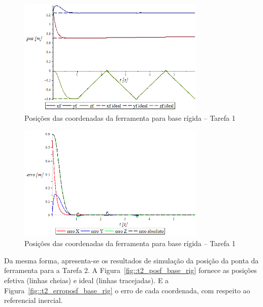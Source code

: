 \begin{figure}[h!]
	\centering 
 	\includegraphics[width=0.80\textwidth]{figs/t1_posf_base_rig}
 	\caption{Posições das coordenadas da ferramenta para base rígida -- Tarefa 1}
 	\label{fig::t1_posf_base_rig}
\end{figure}

\begin{figure}[h!]
	\centering 
 	\includegraphics[width=0.80\textwidth]{figs/t1_erroposf_base_rig}
 	\caption{Posições das coordenadas da ferramenta para base rígida -- Tarefa 1}
 	\label{fig::t1_erroposf_base_rig}
\end{figure}

Da mesma forma, apresenta-se os resultados de simulação da posição da ponta da
ferramenta para a Tarefa 2. A Figura~\ref{fig::t2_posf_base_rig} fornece as
posições efetiva (linhas cheias) e ideal (linhas tracejadas). E a
Figura~\ref{fig::t2_erroposf_base_rig} o erro de cada coordenada, com respeito
ao referencial inercial.

